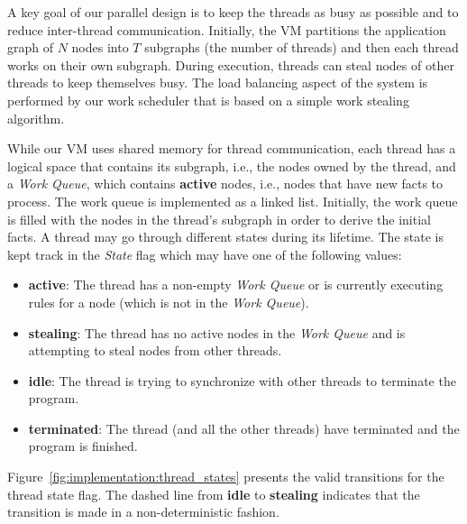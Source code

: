 A key goal of our parallel design is to keep the threads as busy as possible and
to reduce inter-thread communication. Initially, the VM partitions the
application graph of $N$ nodes into $T$ subgraphs (the number of threads) and
then each thread works on their own subgraph. During execution, threads can
steal nodes of other threads to keep themselves busy. The load balancing aspect
of the system is performed by our work scheduler that is based on a simple work
stealing algorithm.

While our VM uses shared memory for thread communication, each
thread has a logical space that contains its subgraph, i.e., the nodes owned by
the thread, and a \emph{Work Queue}, which contains \textbf{active} nodes, i.e.,
nodes that have new facts to process.  The work queue is implemented as a linked
list. Initially, the work queue is filled with the nodes in the thread's
subgraph in order to derive the initial facts. A thread may go through different
states during its lifetime. The state is kept track in the \emph{State} flag
which may have one of the following values:

\begin{itemize}

   \item \textbf{active}: The thread has a non-empty \emph{Work Queue} or is
      currently executing rules for a node (which is not in the \emph{Work
      Queue}).

   \item \textbf{stealing}: The thread has no active nodes in the \emph{Work
      Queue} and is attempting to steal nodes from other
      threads.

   \item \textbf{idle}: The thread is trying to synchronize with other threads
      to terminate the program.
   
   \item \textbf{terminated}: The thread (and all the other threads) have
      terminated and the program is finished.

\end{itemize}

Figure~\ref{fig:implementation:thread_states} presents the valid transitions for
the thread state flag. The dashed line from \textbf{idle} to \textbf{stealing}
indicates that the transition is made in a non-deterministic fashion.

